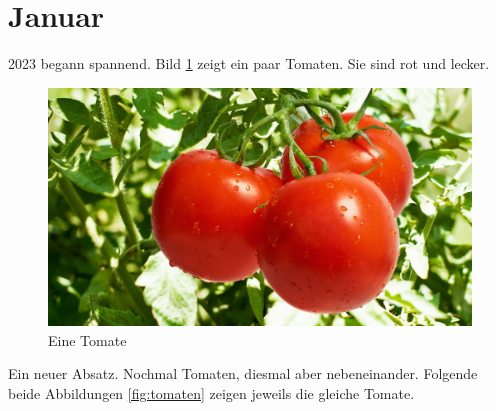 \chapter*{Januar}

2023 begann spannend. Bild \ref{fig:tomate1} zeigt ein paar Tomaten. Sie sind rot und lecker.

\begin{figure}[h!]
  \includegraphics[width=\linewidth]{fig/tomate.jpg}
  \caption{Eine Tomate}
  \label{fig:tomate1}
\end{figure}

Ein neuer Absatz. Nochmal Tomaten, diesmal aber nebeneinander. Folgende beide Abbildungen \ref{fig:tomaten} zeigen jeweils die gleiche Tomate.

